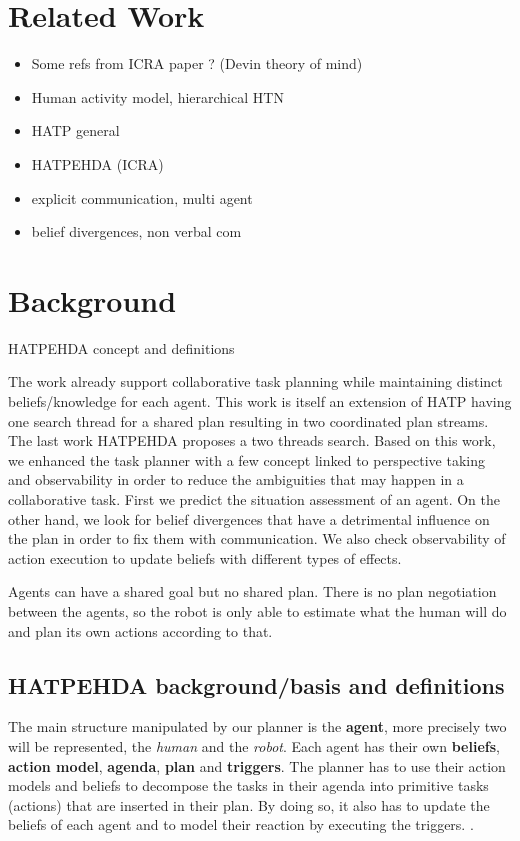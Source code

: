 \documentclass[letterpaper]{article} %
\begin{document}
\clearpage
\section{Related Work}

\begin{itemize}
    \item Some refs from ICRA paper ? (Devin theory of mind) 
    \item Human activity model, hierarchical HTN
    \item HATP general
    \item HATPEHDA (ICRA)
    \item explicit communication, multi agent 
    \item belief divergences, non verbal com
\end{itemize}

\section{Background}
HATPEHDA concept and definitions

The work \cite{buisan:hal-03684211} already support collaborative task planning while maintaining distinct beliefs/knowledge for each agent. This work is itself an extension of HATP \cite{hatp?} having one search thread for a shared plan resulting in two coordinated plan streams. The last work HATPEHDA proposes a two threads search. Based on this work, we enhanced the task planner with a few concept linked to perspective taking and observability in order to reduce the ambiguities that may happen in a collaborative task. First we predict the situation assessment of an agent. On the other hand, we look for belief divergences that have a detrimental influence on the plan in order to fix them with communication. We also check observability of action execution to update beliefs with different types of effects.

Agents can have a shared goal but no shared plan. There is no plan negotiation between the agents, so the robot is only able to estimate what the human will do and plan its own actions according to that.

\subsection{HATPEHDA background/basis and definitions}

The main structure manipulated by our planner is the \textbf{agent}, more precisely two will be represented, the \textit{human} and the \textit{robot}. Each agent has their own \textbf{beliefs}, \textbf{action model}, \textbf{agenda}, \textbf{plan} and \textbf{triggers}. The planner has to use their action models and beliefs to decompose the tasks in their agenda into primitive tasks (actions) that are inserted in their plan. By doing so, it also has to update the beliefs of each agent and to model their reaction by executing the triggers. \cite{buisan:hal-03684211}.
\end{document}

